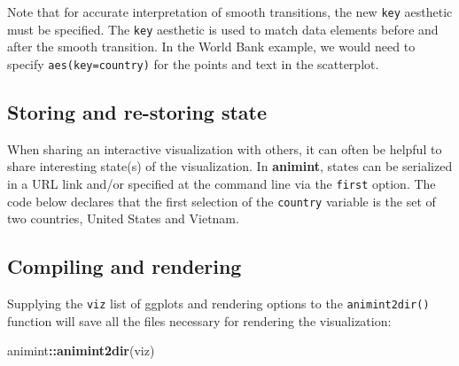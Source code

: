 \documentclass[12pt,]{article}
\newenvironment{Shaded}{\begin{snugshade}}{\end{snugshade}}
\newcommand{\DataTypeTok}[1]{\textcolor[rgb]{0.13,0.29,0.53}{#1}}
\newcommand{\DecValTok}[1]{\textcolor[rgb]{0.00,0.00,0.81}{#1}}
\newcommand{\KeywordTok}[1]{\textcolor[rgb]{0.13,0.29,0.53}{\textbf{#1}}}
\newcommand{\NormalTok}[1]{#1}
\newcommand{\OperatorTok}[1]{\textcolor[rgb]{0.81,0.36,0.00}{\textbf{#1}}}
\newcommand{\StringTok}[1]{\textcolor[rgb]{0.31,0.60,0.02}{#1}}
\theoremstyle{definition}
\theoremstyle{definition}
\theoremstyle{definition}
\theoremstyle{remark}
\begin{document}
\begin{Shaded}
\end{Shaded}

Note that for accurate interpretation of smooth transitions, the new
\texttt{key} aesthetic must be specified. The \texttt{key} aesthetic is
used to match data elements before and after the smooth transition. In
the World Bank example, we would need to specify
\texttt{aes(key=country)} for the points and text in the scatterplot.

\hypertarget{storing-and-re-storing-state}{%
\subsection{Storing and re-storing
state}\label{storing-and-re-storing-state}}

When sharing an interactive visualization with others, it can often be
helpful to share interesting state(s) of the visualization. In
\textbf{animint}, states can be serialized in a URL link and/or
specified at the command line via the \texttt{first} option. The code
below declares that the first selection of the \texttt{country} variable
is the set of two countries, United States and Vietnam.

\begin{Shaded}
\end{Shaded}

\hypertarget{compiling-and-rendering}{%
\subsection{Compiling and rendering}\label{compiling-and-rendering}}

Supplying the \texttt{viz} list of ggplots and rendering options to the
\texttt{animint2dir()} function will save all the files necessary for
rendering the visualization:

\begin{Shaded}
\begin{Highlighting}[]
\NormalTok{animint}\OperatorTok{::}\KeywordTok{animint2dir}\NormalTok{(viz)}
\end{Highlighting}
\end{Shaded}
\end{document}
